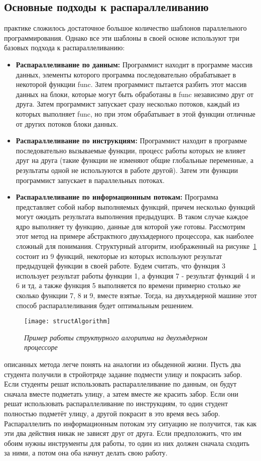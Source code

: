 { %
	\subsection{Основные подходы к распараллеливанию}
	 практике сложилось достаточное большое количество шаблонов параллельного программирования. Однако все эти шаблоны в своей основе используют три базовых подхода к распараллеливанию:
	\begin{itemize}
		\item\textbf{Распараллеливание по данным:} Программист находит в программе массив данных, элементы которого программа последовательно обрабатывает в некоторой функции func. Затем программист пытается разбить этот массив данных на блоки, которые могут быть обработаны в func независимо друг от друга. Затем программист запускает сразу несколько потоков, каждый из которых выполняет func, но при этом обрабатывает в этой функции отличные от других потоков блоки данных.
		\item\textbf{Распараллеливание по инструкциям:} Программист находит в программе последовательно вызываемые функции, процесс работы которых не влияет друг на друга (такие функции не изменяют общие глобальные переменные, а результаты одной не используются в работе другой). Затем эти функции программист запускает в параллельных потоках.
		\item\textbf{Распараллеливание по информационным потокам:} Программа представляет собой набор выполняемых функций, причем несколько функций могут ожидать результата выполнения предыдущих. В таком случае каждое ядро выполняет ту функцию, данные для которой уже готовы. Рассмотрим этот метод на примере абстрактного двухъядерного процессора, как наиболее сложный для понимания. Структурный алгоритм, изображенный на рисунке~\ref{structAlgorithm:image} состоит из 9 функций, некоторые из которых используют результат предыдущей функции в своей работе. Будем считать, что функция 3 использует результат работы функции 1, а функция 7 - результат функций 4 и 6 и тд, а также функция 5 выполняется по времени примерно столько же сколько функции 7, 8 и 9, вместе взятые. Тогда, на двухъядерной машине этот способ распараллеливания будет оптимальным решением.
	\end{itemize}
	\begin{figure}[H]
		\texttt{[image: structAlgorithm]}
		\caption{\textit{Пример работы структурного алгоритма на двухъядерном процессоре}}
		\label{structAlgorithm:image}
	\end{figure}
	 описанных метода легче понять на аналогии из обыденной жизни. Пусть два студента получили в стройотряде задание подмести улицу и покрасить забор. Если студенты решат использовать распараллеливание по данным, он будут сначала вместе подметать улицу, а затем вместе же красить забор. Если они решат использовать распараллеливание по инструкциям, то один студент полностью подметёт улицу, а другой покрасит в это время весь забор. Распараллелить по информационным потокам эту ситуацию не получится, так как эти два действия никак не зависят друг от друга. Если предположить, что им обоим нужны инструменты для работы, то один из них должен сначала сходить за ними, а потом она оба начнут делать свою работу.
}
